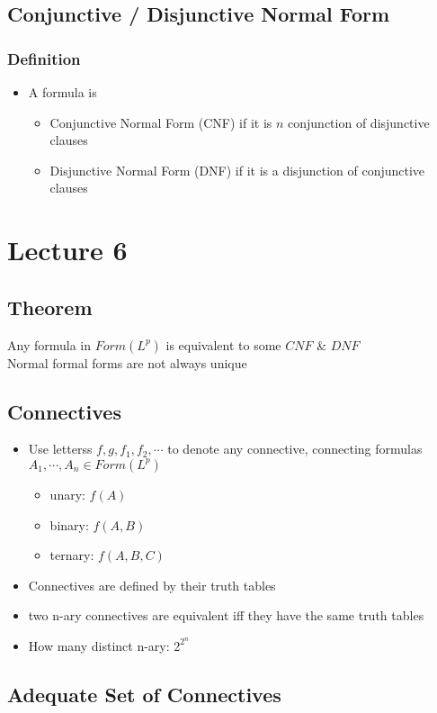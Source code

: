 \documentclass[11pt]{article}
\begin{document}
\subsection{Conjunctive / Disjunctive Normal Form}
\subsubsection{Definition}
\begin{itemize}
    \item A formula is 
    \begin{itemize}
        \item Conjunctive Normal Form (CNF) if it is $n$ conjunction of disjunctive clauses 
        \item Disjunctive Normal Form (DNF) if it is a disjunction of conjunctive clauses 
    \end{itemize}
\end{itemize}

\section{Lecture 6}
\subsection{Theorem}
Any formula in $Form(L^p)$ is equivalent to some $CNF$ \& $DNF$\\
Normal formal forms are not always unique
\subsection{Connectives}
\begin{itemize}
    \item Use letterss $f,g,f_1,f_2,\cdots$ to denote any connective, connecting formulas $A_1, \cdots, A_n\in Form(L^p)$
    \begin{itemize}
        \item unary: $f(A)$
        \item binary: $f(A, B)$
        \item ternary: $f(A,B,C)$
    \end{itemize}
    \item Connectives are defined by their truth tables 
    \item two n-ary connectives are equivalent iff they have the same truth tables 
    \item How many distinct n-ary: $2^{2^n}$
\end{itemize}
\subsection{Adequate Set of Connectives}
\end{document}
